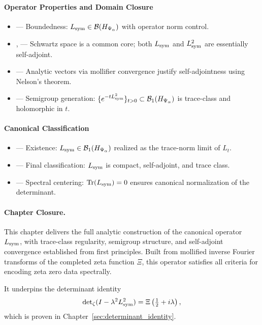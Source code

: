 \paragraph{Operator Properties and Domain Closure}
\begin{itemize}
  \item {} — Boundedness: \( L_{\mathrm{sym}} \in \mathcal{B}(H_{\Psi_\alpha}) \) with operator norm control.
  \item {},  — Schwartz space is a common core; both \( L_{\mathrm{sym}} \) and \( L_{\mathrm{sym}}^2 \) are essentially self-adjoint.
  \item {} — Analytic vectors via mollifier convergence justify self-adjointness using Nelson’s theorem.
  \item {} — Semigroup generation: \( \{ e^{-t L_{\mathrm{sym}}^2} \}_{t > 0} \subset \mathcal{B}_1(H_{\Psi_\alpha}) \) is trace-class and holomorphic in \( t \).
\end{itemize}

\paragraph{Canonical Classification}
\begin{itemize}
  \item {} — Existence: \( L_{\mathrm{sym}} \in \mathcal{B}_1(H_{\Psi_\alpha}) \) realized as the trace-norm limit of \( L_t \).
  \item {} — Final classification: \( L_{\mathrm{sym}} \) is compact, self-adjoint, and trace class.
  \item {} — Spectral centering: \( \operatorname{Tr}(L_{\mathrm{sym}}) = 0 \) ensures canonical normalization of the determinant.
\end{itemize}

\paragraph{Chapter Closure.}
This chapter delivers the full analytic construction of the canonical operator \( L_{\mathrm{sym}} \), with trace-class regularity, semigroup structure, and self-adjoint convergence established from first principles. Built from mollified inverse Fourier transforms of the completed zeta function \( \Xi \), this operator satisfies all criteria for encoding zeta zero data spectrally.

It underpins the determinant identity
\[
\det\nolimits_{\zeta}(I - \lambda^2 L_{\mathrm{sym}}^2) = \Xi\left(\tfrac{1}{2} + i\lambda\right),
\]
which is proven in Chapter~\ref{sec:determinant_identity}.
